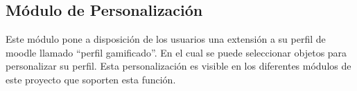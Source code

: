 \subsection*{Módulo de Personalización}

 \noindent
 Este módulo pone a disposición de los usuarios una extensión a su perfil de moodle llamado ``perfil gamificado''. En el cual se puede
 seleccionar objetos para personalizar su perfil. Esta personalización es visible en los diferentes módulos de este proyecto que soporten
 esta función.












